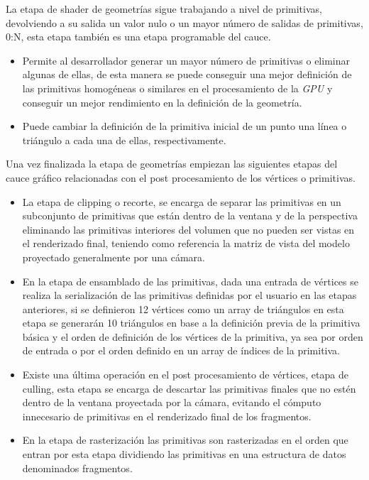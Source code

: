 \documentclass[a4paper]{book}
\begin{document}
La etapa de shader de geometrías sigue trabajando a nivel de primitivas, devolviendo a su salida un valor nulo o un mayor número de
salidas de primitivas, 0:N, esta etapa también es una etapa programable del cauce.

\begin{itemize}
  \item Permite al desarrollador generar un mayor número de primitivas o eliminar algunas de ellas, de esta manera se puede conseguir
  una mejor definición de las primitivas homogéneas o similares en el procesamiento de la \textit{GPU} y conseguir un mejor rendimiento en la
  definición de la geometría.

  \item Puede cambiar la definición de la primitiva inicial de un punto una línea o triángulo a cada una de ellas, respectivamente.
\end{itemize}

Una vez finalizada la etapa de geometrías empiezan las siguientes etapas del cauce gráfico relacionadas con el post procesamiento
de los vértices o primitivas.

\begin{itemize}
  \item La etapa de clipping o recorte, se encarga de separar las primitivas en un subconjunto de primitivas que están dentro de la
  ventana y de la perspectiva eliminando las primitivas interiores del volumen que no pueden ser vistas en el renderizado final,
  teniendo como referencia la matriz de vista del modelo proyectado generalmente por una cámara.

  \item En la etapa de ensamblado de las primitivas, dada una entrada de vértices se realiza la serialización de las primitivas
  definidas por el usuario en las etapas anteriores, si se definieron 12 vértices como un array de triángulos en esta etapa se
  generarán 10 triángulos en base a la definición previa de la primitiva básica y el orden de definición de los vértices de la
  primitiva, ya sea por orden de entrada o por el orden definido en un array de índices de la primitiva.

  \item Existe una última operación en el post procesamiento de vértices, etapa de culling, esta etapa se encarga de descartar las
  primitivas finales que no estén dentro de la ventana proyectada por la cámara, evitando el cómputo innecesario de primitivas en
  el renderizado final de los fragmentos.

  \item En la etapa de rasterización las primitivas son rasterizadas en el orden que entran por esta etapa dividiendo las primitivas
  en una estructura de datos denominados fragmentos.
\end{itemize}
\end{document}
